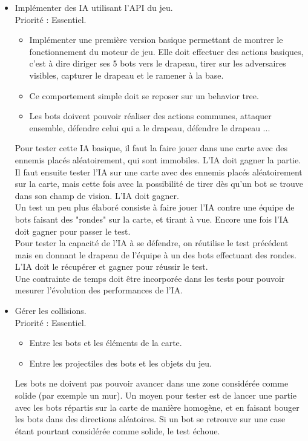 \documentclass[french]{article}
\begin{document}
\begin{itemize}
        \item Implémenter des IA utilisant l'API du jeu. \\
            Priorité : Essentiel.
            \begin{itemize}
                \item Implémenter une première version basique permettant de montrer le fonctionnement du moteur de jeu. Elle doit effectuer des actions basiques, c'est à dire diriger ses 5 bots vers le drapeau,
                tirer sur les adversaires visibles, capturer le drapeau et le ramener à la base.
                \item Ce comportement simple doit se reposer sur un behavior tree\cite{colledanchise2017behavior}.
                \item Les bots doivent pouvoir réaliser des actions communes, attaquer ensemble, défendre celui qui a le drapeau, défendre le drapeau ... \\
            \end{itemize}
            Pour tester cette IA basique, il faut la faire jouer dans une carte avec des ennemis placés aléatoirement, qui sont immobiles. L'IA doit gagner la partie.\\
            Il faut ensuite tester l'IA sur une carte avec des ennemis placés aléatoirement sur la carte, mais cette fois avec la possibilité de tirer dès qu'un bot se trouve dans son champ de vision. L'IA doit gagner. \\
            Un test un peu plus élaboré consiste à faire jouer l'IA contre une équipe de bots faisant des "rondes" sur la carte, et tirant à vue. Encore une fois l'IA doit gagner pour passer le test.\\
            
            Pour tester la capacité de l'IA à se défendre, on réutilise le test précédent mais en donnant le drapeau de l'équipe à un des bots effectuant des rondes. L'IA doit le récupérer et gagner pour réussir le test.\\
            Une contrainte de temps doit être incorporée dans les tests pour pouvoir mesurer l'évolution des performances de l'IA. \\


        \item Gérer les collisions. \\
                Priorité : Essentiel.
                \begin{itemize}
                    \item Entre les bots et les éléments de la carte.
                    \item Entre les projectiles des bots et les objets du jeu.\\
                \end{itemize}
                Les bots ne doivent pas pouvoir avancer dans une zone considérée comme solide (par exemple un mur). Un moyen pour tester est de lancer une partie avec les bots répartis sur la carte de manière homogène, et en faisant bouger les bots dans des directions aléatoires. Si un bot se retrouve sur une case étant pourtant considérée comme solide, le test échoue.\\
                

\end{itemize}
\end{document}
